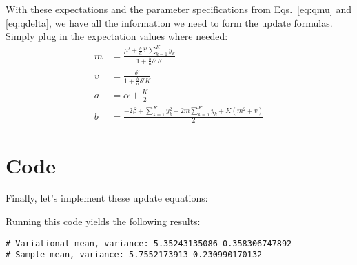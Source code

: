\documentclass[12pt]{article}
\begin{document}
With these expectations and the parameter specifications from Eqs.~\ref{eq:qmu}
and \ref{eq:qdelta}, we have all the information we need to form the update
formulas.  Simply plug in the expectation values where needed:
\begin{align}
    m &= \frac{\mu' + \frac{b}{a} \delta' \sum_{k=1}^{K}
    y_{k}}{1 + \frac{b}{a}\delta'K}
    \\
    v &= \frac{\delta'}{1 + \frac{b}{a}\delta'K}
    \\
    a &= \alpha + \frac{K}{2}
    \\
    b &= \frac{-2\beta + \sum_{k=1}^{K} y_{k}^{2} - 2m
    \sum_{k=1}^{K} y_{k} + K(m^2 + v)}{2}
\end{align}

\section{Code}

Finally, let's implement these update equations:


Running this code yields the following results:
\begin{verbatim}
# Variational mean, variance: 5.35243135086 0.358306747892
# Sample mean, variance: 5.7552173913 0.230990170132
\end{verbatim}
\end{document}
